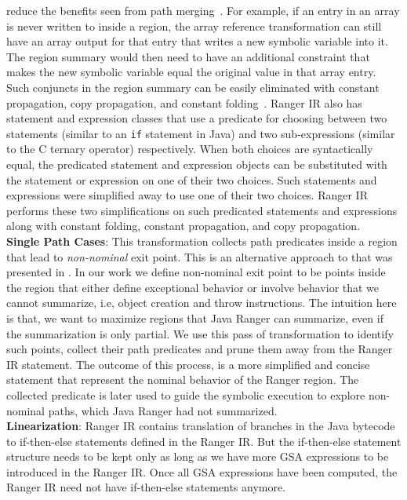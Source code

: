 reduce the benefits seen from path merging~\cite{angr}.
%
For example, if an entry in an array is never written to inside a region, the array reference transformation can still have an
array output for that entry that writes a new symbolic variable into it.
%
The region summary would then need to have an additional constraint that makes the new symbolic variable equal the
original value in that array entry.
%
Such conjuncts in the region summary can be easily eliminated with constant propagation, copy propagation, and constant
folding~\cite{dragon-book}.
%
Ranger IR also has statement and expression classes that use a predicate for choosing between two statements (similar to
an {\tt if} statement in Java) and two sub-expressions (similar to the C ternary operator) respectively.
%
When both choices are syntactically equal, the predicated statement and expression objects can be substituted with the
statement or expression on one of their two choices.
%
Such statements and expressions were simplified away to use one of their two choices.
%
Ranger IR performs these two simplifications on such predicated statements and expressions along with constant folding,
constant propagation, and copy propagation.\\
\textbf{Single Path Cases}: This transformation collects path predicates inside a region that lead to
\textit{non-nominal} exit point.
%
This is an alternative approach to that was presented in \cite{veritesting}.
%
In our work we define non-nominal exit point to be points inside the region that either define exceptional behavior or
involve behavior that we cannot summarize, i.e, object creation and throw instructions.
%
The intuition here is that, we want to maximize regions that Java Ranger can summarize, even if the summarization is
only partial.
%
We use this pass of transformation to identify such points, collect their path predicates and prune them away from the
Ranger IR statement.
%
The outcome of this process, is a more simplified and concise statement that represent the nominal behavior of the Ranger region.
%
The collected predicate is later used to guide the symbolic execution to explore non-nominal paths, which Java Ranger
had not summarized.  \\
%
\textbf{Linearization}:
Ranger IR contains translation of branches in the Java bytecode to if-then-else statements defined in the Ranger IR.
%
But the if-then-else statement structure needs to be kept only as long as we have more GSA expressions to be
introduced in the Ranger IR.
%
Once all GSA expressions have been computed, the Ranger IR need not have if-then-else statements anymore.
